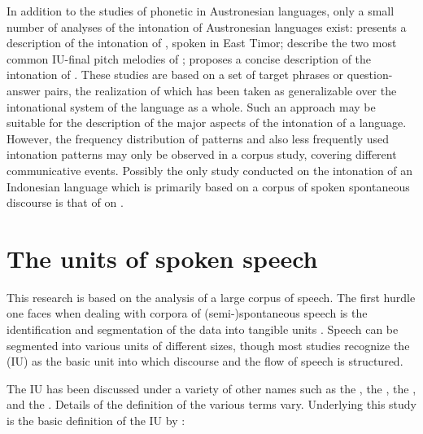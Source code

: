 In addition to the studies of phonetic  in Austronesian languages, only a small number of analyses of the intonation of Austronesian languages exist: \citet{himmelmann2010notes} presents a description of the intonation of , spoken in East Timor; \citet{Maskikit_Essed_2016} describe the two most common IU-final pitch melodies of ; \citet{stoel2006intonation} proposes a concise description of the intonation of . These studies are based on a set of target phrases or question-answer pairs, the realization of which has been taken as generalizable over the intonational system of the language as a whole. Such an approach may be suitable for the description of the major aspects of the intonation of a language. However, the frequency distribution of patterns  and also less frequently used intonation patterns may only be observed in a corpus study, covering different communicative events. Possibly the only study conducted on the intonation of an Indonesian language which is primarily based on a corpus of spoken spontaneous discourse is that of \citet{stoel2005focus} on .


\section{The units of spoken speech}
\label{The units of spoken speech}


This research is based on the  analysis of a large corpus of speech. The first hurdle one faces when dealing with  corpora of (semi-)spontaneous speech is the identification and segmentation of the data into tangible units \citep{himmelmann2006challenges, Talking_data}. Speech can be segmented into various units of different sizes, though most studies recognize the  (IU) \citep{chafe1994discourse} as the basic unit into which discourse and the flow of speech is structured.

The IU  has been discussed under a variety of other names such as the  \citep{Halliday_1967}, the  \citep{crystal1969prosodic},  the  \citep{selkirk1986, nespor1983prosodic, pierrehumbert1980phonology, Ladd_2008, 2021_Handbook_pros, jun2006, jun_2014}, and the  \citep{lieberman1966intonation, lieberman1970articulatory}. Details of the definition of the various terms vary. Underlying this study is the basic definition of the IU by  \citet[22]{Chafe_1987}:





